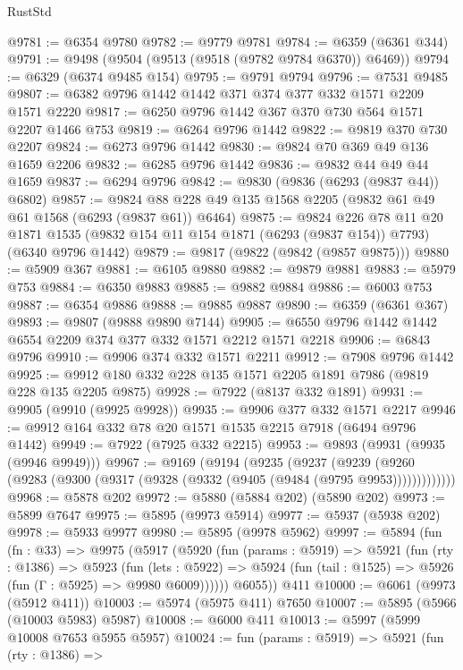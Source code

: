 \begin{lexlean}{RustStd}
\begin{coremodule}
{{@9781 := @6354 @9780
@9782 := @9779 @9781
@9784 := @6359 (@6361 @344)
@9791 := @9498 (@9504 (@9513 (@9518 (@9782 @9784 @6370)) @6469))
@9794 := @6329 (@6374 @9485 @154)
@9795 := @9791 @9794
@9796 := @7531 @9485
@9807 := @6382 @9796 @1442 @1442 @371 @374 @377 @332 @1571 @2209 @1571 @2220
@9817 := @6250 @9796 @1442 @367 @370 @730 @564 @1571 @2207 @1466 @753
@9819 := @6264 @9796 @1442
@9822 := @9819 @370 @730 @2207
@9824 := @6273 @9796 @1442
@9830 := @9824 @70 @369 @49 @136 @1659 @2206
@9832 := @6285 @9796 @1442
@9836 := @9832 @44 @49 @44 @1659
@9837 := @6294 @9796
@9842 := @9830 (@9836 (@6293 (@9837 @44)) @6802)
@9857 := @9824 @88 @228 @49 @135 @1568 @2205 (@9832 @61 @49 @61 @1568 (@6293 (@9837 @61)) @6464)
@9875 := @9824
    @226
    @78
    @11
    @20
    @1871
    @1535
    (@9832 @154 @11 @154 @1871 (@6293 (@9837 @154)) @7793)
    (@6340 @9796 @1442)
@9879 := @9817 (@9822 (@9842 (@9857 @9875)))
@9880 := @5909 @367
@9881 := @6105 @9880
@9882 := @9879 @9881
@9883 := @5979 @753
@9884 := @6350 @9883
@9885 := @9882 @9884
@9886 := @6003 @753
@9887 := @6354 @9886
@9888 := @9885 @9887
@9890 := @6359 (@6361 @367)
@9893 := @9807 (@9888 @9890 @7144)
@9905 := @6550 @9796 @1442 @1442 @6554 @2209 @374 @377 @332 @1571 @2212 @1571 @2218
@9906 := @6843 @9796
@9910 := @9906 @374 @332 @1571 @2211
@9912 := @7908 @9796 @1442
@9925 := @9912 @180 @332 @228 @135 @1571 @2205 @1891 @7986 (@9819 @228 @135 @2205 @9875)
@9928 := @7922 (@8137 @332 @1891)
@9931 := @9905 (@9910 (@9925 @9928))
@9935 := @9906 @377 @332 @1571 @2217
@9946 := @9912 @164 @332 @78 @20 @1571 @1535 @2215 @7918 (@6494 @9796 @1442)
@9949 := @7922 (@7925 @332 @2215)
@9953 := @9893 (@9931 (@9935 (@9946 @9949)))
@9967 := @9169
    (@9194
      (@9235
        (@9237
          (@9239 (@9260 (@9283 (@9300 (@9317 (@9328 (@9332 (@9405 (@9484 (@9795 @9953)))))))))))))
@9968 := @5878 @202
@9972 := @5880 (@5884 @202) (@5890 @202)
@9973 := @5899 @7647
@9975 := @5895 (@9973 @5914)
@9977 := @5937 (@5938 @202)
@9978 := @5933 @9977
@9980 := @5895 (@9978 @5962)
@9997 := @5894
    (fun (fn : @33) =>
    @9975
      (@5917
        (@5920
          (fun (params : @5919) =>
          @5921
            (fun (rty : @1386) =>
            @5923
              (fun (lets : @5922) =>
              @5924 (fun (tail : @1525) => @5926 (fun (Γ : @5925) => @9980 @6009))))))
        @6055))
    @411
@10000 := @6061 (@9973 (@5912 @411))
@10003 := @5974 (@5975 @411) @7650
@10007 := @5895 (@5966 (@10003 @5983) @5987)
@10008 := @6000 @411
@10013 := @5997 (@5999 @10008 @7653 @5955 @5957)
@10024 := fun (params : @5919) =>
  @5921
    (fun (rty : @1386) =>
}}
\end{coremodule}
\end{lexlean}
